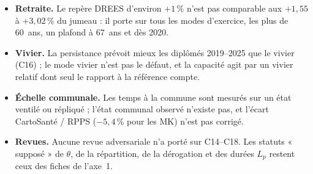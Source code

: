 \begin{itemize}
  \item \textbf{Retraite.} Le repère DREES d'environ $+1$\,\% n'est pas comparable aux $+1{,}55$ à
        $+3{,}02$\mesure{}\,\% du jumeau : il porte sur tous les modes d'exercice, les plus de 60~ans, un plafond à
        67~ans et dès 2020.
  \item \textbf{Vivier.} La persistance prévoit mieux les diplômés 2019--2025 que le vivier (C16) ; le mode
        vivier n'est pas le défaut, et la capacité agit par un vivier relatif dont seul le rapport à la référence
        compte.
  \item \textbf{Échelle communale.} Les temps à la commune sont mesurés sur un état ventilé ou répliqué ;
        l'état communal observé n'existe pas, et l'écart CartoSanté / RPPS ($-5{,}4$\mesure{}\,\% pour les MK)
        n'est pas corrigé.
  \item \textbf{Revues.} Aucune revue adversariale n'a porté sur C14--C18. Les statuts « supposé » de
        $\theta$, de la répartition, de la dérogation et des durées $L_p$ restent ceux des fiches de l'axe~1.
\end{itemize}
\endgroup
